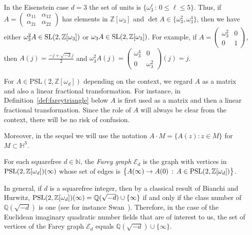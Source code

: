 \documentclass[graybox]{svmult}
\begin{document}
In the Eisenstein case $d=3$ the set of units is  $\{ \omega_{3}^{\ell}\,:\, 0 \le \ell \le 5\}$. Thus, if  $A = \begin{pmatrix} \alpha_{11} &\alpha_{12} \\ \alpha_{21} & \alpha_{22} \end{pmatrix}$ has elements in $\mathbb{Z}[\omega_3]$ and $\det A \in\{ \omega_{3}^{2}, \omega_{3}^{4}\}$, then we have either $\omega_{3}^{2} A\in {\rm SL}(2,\mathbb{Z}[\omega_3])$ or $\omega_{3} A \in {\rm SL}(2,\mathbb{Z}[\omega_3])$.   For example, if $A = \begin{pmatrix} \omega_{3}^{2} & 0 \\ 0 &1 \end{pmatrix}$, then  $A(j) = \tfrac{-j + \sqrt{-3}j}{2}$ and $\omega_{3}^{2}A(j)= \begin{pmatrix} \omega_{3}^{4}  & 0 \\ 0 &\omega_{3}^{2} \end{pmatrix}(j) = j$.   

\begin{remark} 
For $A\in \mathrm{PSL}(2, \mathbb{Z}[\omega_d])$ depending on the context, we regard $A$ as a matrix and 
also a linear fractional transformation.  For instance, in Definition~\ref{def:fareytriangle} below  $A$ is first used as a matrix and then a linear fractional transformation. Since the role of $A$ will always be clear from the context, there will be no risk of confusion.

Moreover, in the sequel we will use the notation $A\cdot M = \{ A(z) : z \in M\}$ for $M\subset \mathbb{H}^3$. 
\end{remark}

\begin{definition}
For each squarefree $d\in\mathbb{N}$, the {\em Farey graph}  $\mathcal E_{d}$ is the graph with vertices in ${\rm PSL}(2,  \mathbb{Z}[\omega_d]) (\infty)$  whose set of edges is $\big\{A(\infty) \to A(0)\,: \, A \in {\rm PSL}(2, \mathbb{Z}[\omega_d])\big\}$. 
\end{definition}
\begin{remark}  In general, if $d$ is a  squarefree integer, then 
by a classical result of Bianchi and Hurwitz, ${\rm PSL}(2, \mathbb{Z}[\omega_d]) (\infty) = \mathbb Q(\sqrt{-d}) \cup \{\infty\} $ if and 
only if the class number of $\mathbb Q(\sqrt{-d})$ is one (see for instance Swan~\cite[Proposition~3.10 and the remark after it]{Swan:71}). Therefore, in the case of the Euclidean imaginary quadratic number fields that are of interest to us, the set of vertices of the Farey graph  $\mathcal E_{d}$ equals $\mathbb Q(\sqrt{-d}) \cup \{\infty\}$.
\end{remark}
\end{document}
